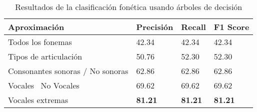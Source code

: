 \begin{table}[H]
\centering
\caption{Resultados de la clasificación fonética usando árboles de decisión}
\label{tab:resultados_arboles}
\begin{tabular}{|l|l|l|l|}
\hline
Aproximación                     & Precisión & Recall & F1 Score \\ \hline
Todos los fonemas                & 42.34     & 42.34  & 42.34    \\ \hline
Tipos de articulación            & 50.76     & 52.30  & 52.30    \\ \hline
Consonantes sonoras / No sonoras & 62.86     & 62.86  & 62.86    \\ \hline
Vocales \ No Vocales             & 69.62     & 69.62  & 69.62    \\ \hline
Vocales extremas                 & \textbf{81.21}     & \textbf{81.21}  & \textbf{81.21}    \\ \hline


\end{tabular}
\end{table}